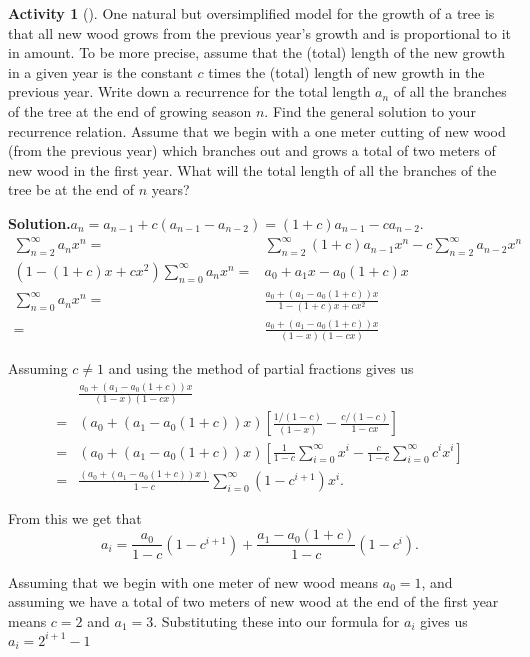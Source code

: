 \documentclass[10pt,]{book}
\theoremstyle{plain}
\theoremstyle{definition}
\newtheorem{activity}[project]{Activity}
\numberwithin{equation}{chapter}
\newcommand{\amp}{&}
\begin{document}
\begin{activity}[]\label{activity-203}
One natural but oversimplified model for the growth of a tree is that all new wood grows from the previous year's growth and is proportional to it in amount. To be more precise, assume that the (total) length of the new growth in a given year is the constant \(c\) times the (total) length of new growth in the previous year. Write down a recurrence for the total length \(a_n\) of all the branches of the tree at the end of growing season \(n\). Find the general solution to your recurrence relation. Assume that we begin with a one meter cutting of new wood (from the previous year) which branches out and grows a total of two meters of new wood in the first year.  What will the total length of all the branches of the tree be at the end of \(n\) years?%
\par\medskip\noindent%
\textbf{Solution.}\quad \(a_n= a_{n-1} +c(a_{n-1}-a_{n-2})=(1+c)a_{n-1}-ca_{n-2}\).%
\begin{align*}
\sum_{n=2}^\infty
a_nx^n =\amp \sum_{n=2}^\infty(1+c)a_{n-1}x^n-c\sum_{n=2}^\infty a_{n-2}x^n\\
(1-(1+c)x +cx^2)\sum_{n=0}^\infty a_nx^n =\amp a_0+a_1x-a_0(1+c)x\\
\sum_{n=0}^\infty a_nx^n  =\amp  \frac{a_0+(a_1-a_0(1+c))x}{1-(1+c)x +cx^2}\\
=\amp  \frac{a_0+(a_1-a_0(1+c))x}{(1-x)(1-cx)}
\end{align*}
%
\par
Assuming \(c\not=1\) and using the method of partial fractions gives us%
\begin{align*}
\amp \frac{a_0+(a_1-a_0(1+c))x}{(1-x)(1-cx)}\\
=\amp  (a_0+(a_1-a_0(1+c))x)
\left[\frac{1/(1-c)}{(1-x)} -\frac{c/(1-c)}{1-cx}\right]\\
=\amp  (a_0+(a_1-a_0(1+c))x)\left[\frac{1}{1-c}\sum_{i=0}^\infty x^i-\frac{c}{1-c}\sum_{i=0}^\infty c^ix^i\right]\\
=\amp  \frac{(a_0+(a_1-a_0(1+c))x)}{1-c}\sum_{i=0}^\infty
(1-c^{i+1})x^i.
\end{align*}
%
\par
From this we get that%
\begin{equation*}
a_i=\frac{a_0}{1-c}(1-c^{i+1}) +\frac{a_1-a_0(1+c)}{1-c}(1-c^i).
\end{equation*}
%
\par
Assuming that we begin with one meter of new wood means \(a_0=1\), and assuming we have a total of two meters of new wood at the end of the first year means \(c=2\) and \(a_1=3\). Substituting these into our formula for \(a_i\) gives us \(a_i=2^{i+1}-1\)%
\end{activity}
\end{document}
